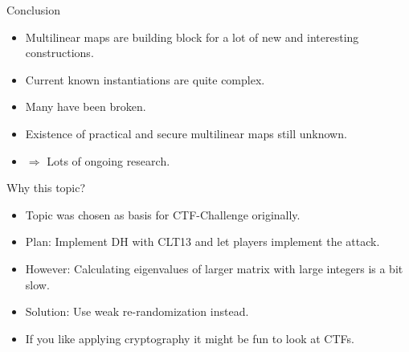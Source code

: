 \documentclass[english]{beamer}
\begin{document}
    \begin{frame}{Conclusion}
        \begin{itemize}
            \item Multilinear maps are building block for a lot of new and interesting constructions.
            \item Current known instantiations are quite complex.
            \item Many have been broken.
            \item Existence of practical and secure multilinear maps still unknown.
            \item $\Rightarrow$ Lots of ongoing research.
        \end{itemize}
    \end{frame}
    \begin{frame}{Why this topic?}
        \begin{itemize}
            \item Topic was chosen as basis for CTF-Challenge originally.
            \item Plan: Implement DH with CLT13 and let players implement the attack.
            \pause
            \item However: Calculating eigenvalues of larger matrix with large integers is a bit slow.
            \item Solution: Use weak re-randomization instead.
            \item If you like applying cryptography it might be fun to look at CTFs.
        \end{itemize}
    \end{frame}
\end{document}
